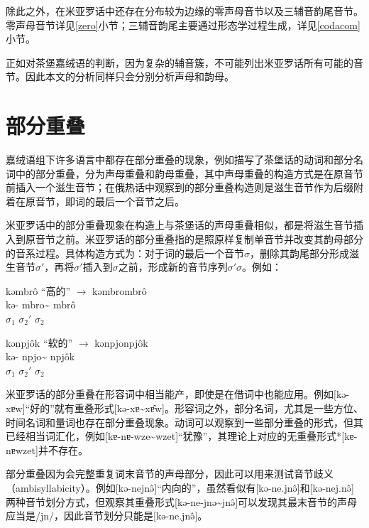 除此之外，在米亚罗话中还存在分布较为边缘的零声母音节以及三辅音韵尾音节。零声母音节详见\ref{zero}小节；三辅音韵尾主要通过形态学过程生成，详见\ref{codacom}小节。

正如\textcite[47]{jacques2021grammar}对茶堡嘉绒语的判断，因为复杂的辅音簇，不可能列出米亚罗话所有可能的音节。因此本文的分析同样只会分别分析声母和韵母。

\section{部分重叠} \label{reduplication}

嘉绒语组下许多语言中都存在部分重叠的现象，例如\textcite{jacques2021grammar}描写了茶堡话的动词和部分名词中的部分重叠，分为声母重叠和韵母重叠，其中声母重叠的构造方式是在原音节前插入一个滋生音节；\textcite{lai2017grammaire}在俄热话中观察到的部分重叠构造则是滋生音节作为后缀附着在原音节，即词的最后一个音节之后。

米亚罗话中的部分重叠现象在构造上与茶堡话的声母重叠相似，都是将滋生音节插入到原音节之前。米亚罗话的部分重叠指的是照原样复制单音节并改变其韵母部分的音系过程。具体构造方式为：对于词的最后一个音节$\sigma$，删除其韵尾部分形成滋生音节$\sigma'$，再将$\sigma'$插入到$\sigma$之前，形成新的音节序列$\sigma'\sigma$。例如：

\begin{exe}
\ex kəmbrô “高的” $\rightarrow$ kəmbrombrô \\
\gll kə- {mbro\textasciitilde} mbrô \\
     $\sigma_{1}$ $\sigma_{2}'$ $\sigma_{2}$ \\
\end{exe}

\begin{exe}
\ex kənpjôk “软的” $\rightarrow$ kənpjonpjôk \\
\gll kə- {npjo\textasciitilde} npjôk \\
     $\sigma_{1}$ $\sigma_{2}'$ $\sigma_{2}$ \\
\end{exe}

米亚罗话的部分重叠在形容词中相当能产，即使是在借词中也能应用。例如[kə-xɐw]“好的”就有重叠形式[kə-xɐ\textasciitilde xɐ̂w]。形容词之外，部分名词，尤其是一些方位、时间名词和量词也存在部分重叠现象。动词可以观察到一些部分重叠的形式，但其已经相当词汇化，例如[kɐ-nɐ-wze\textasciitilde wzet]“犹豫”，其理论上对应的无重叠形式*[kɐ-nɐwzet]并不存在。

部分重叠因为会完整重复词末音节的声母部分，因此可以用来测试音节歧义（ambisyllabicity）。例如[kə-nejnə̂]“内向的”，虽然看似有[kə-ne.jnə̂]和[kə-nej.nə̂]两种音节划分方式，但观察其重叠形式[kə-ne-jnə\textasciitilde jnə̂]可以发现其最末音节的声母应当是/jn/，因此音节划分只能是[kə-ne.jnə̂]。